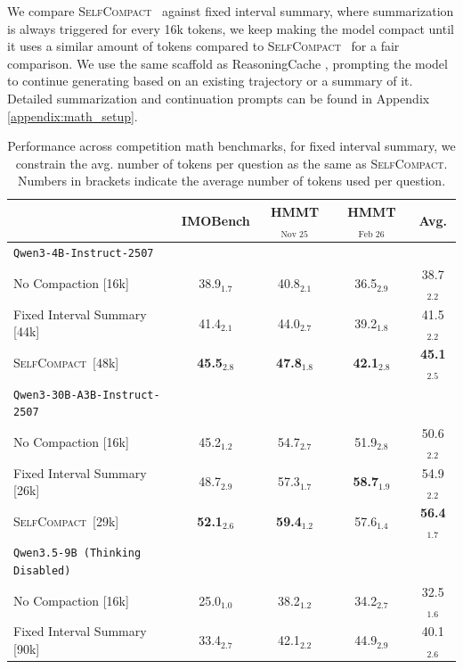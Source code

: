 \documentclass{article}
\newcommand{\method}{\textsc{{SelfCompact}}}
\begin{document}
We compare \method~ against fixed interval summary, where summarization is always triggered for every 16k tokens, we keep making the model compact until it uses a similar amount of tokens compared to \method~ for a fair comparison. We use the same scaffold as ReasoningCache \citep{wu2026reasoningcachecontinualimprovement}, prompting the model to continue generating based on an existing trajectory or a summary of it. Detailed summarization and continuation prompts can be found in Appendix \ref{appendix:math_setup}. 

\begin{table}[h!]
\centering
\caption{Performance across competition math benchmarks, for fixed interval summary, we constrain the avg. number of tokens per question as the same as \method. Numbers in brackets indicate the average number of tokens used per question.}
\label{tab:performance_fixed_vs_adaptive}
\setlength{\tabcolsep}{4pt}
\begin{tabular}{lcccc}
\toprule
& \textbf{IMOBench} & \textbf{HMMT$_\text{Nov 25}$} & \textbf{HMMT$_\text{Feb 26}$} & \textbf{Avg.} \\
\midrule
\texttt{Qwen3-4B-Instruct-2507} \\[2pt]
\quad No Compaction [16k]          & 38.9$_{1.7}$ & 40.8$_{2.1}$ & 36.5$_{2.9}$ & 38.7$_{2.2}$ \\
\quad Fixed Interval Summary [44k] & 41.4$_{2.1}$ & 44.0$_{2.7}$ & 39.2$_{1.8}$ & 41.5$_{2.2}$ \\
\quad \method~[48k]                & \textbf{45.5}$_{2.8}$ & \textbf{47.8}$_{1.8}$ & \textbf{42.1}$_{2.8}$ & \textbf{45.1}$_{2.5}$ \\
\midrule
\texttt{Qwen3-30B-A3B-Instruct-2507} \\[2pt]
\quad No Compaction [16k]          & 45.2$_{1.2}$ & 54.7$_{2.7}$ & 51.9$_{2.8}$ & 50.6$_{2.2}$ \\
\quad Fixed Interval Summary [26k] & 48.7$_{2.9}$ & 57.3$_{1.7}$ & \textbf{58.7}$_{1.9}$ & 54.9$_{2.2}$ \\
\quad \method~[29k]                & \textbf{52.1}$_{2.6}$ & \textbf{59.4}$_{1.2}$ & 57.6$_{1.4}$ & \textbf{56.4}$_{1.7}$ \\
\midrule
\texttt{Qwen3.5-9B (Thinking Disabled)} \\[2pt]
\quad No Compaction [16k]          & 25.0$_{1.0}$ & 38.2$_{1.2}$ & 34.2$_{2.7}$ & 32.5$_{1.6}$ \\
\quad Fixed Interval Summary [90k] & 33.4$_{2.7}$ & 42.1$_{2.2}$ & 44.9$_{2.9}$ & 40.1$_{2.6}$ \\

\end{tabular}
\end{table}
\end{document}
